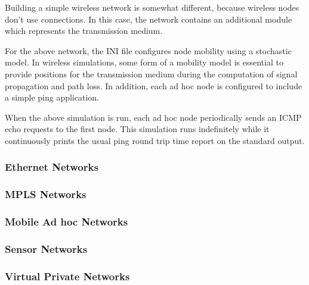 Building a simple wireless network is somewhat different, because wireless nodes don't use \omnet connections. In this case, the network contains an additional module which represents the transmission medium.


For the above network, the INI file configures node mobility using a stochastic model. In wireless simulations, some form of a mobility model is essential to provide positions for the transmission medium during the computation of signal propagation and path loss. In addition, each ad hoc node is configured to include a simple ping application.


When the above simulation is run, each ad hoc node periodically sends an ICMP echo requests to the first node. This simulation runs indefinitely while it continuously prints the usual ping round trip time report on the standard output.

\subsubsection*{Ethernet Networks}


\subsubsection*{MPLS Networks}


\subsubsection*{Mobile Ad hoc Networks}


\subsubsection*{Sensor Networks}


\subsubsection*{Virtual Private Networks}

